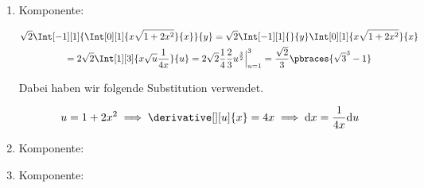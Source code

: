 \begin{solution}
\begin{enumerate}[label = \arabic*.]
    \item Komponente:
    
    \begin{multline*}
        \sqrt 2
        \Int[-1][1]
        {
            \Int[0][1]
            {
                x \sqrt{1 + 2 x^2}
            }{x}
        }{y}
        =
        \sqrt 2
        \Int[-1][1]{}{y}
        \Int[0][1]
        {
            x \sqrt{1 + 2 x^2}
        }{x} \\
        =
        2 \sqrt 2
        \Int[1][3]
        {
            x \sqrt u \frac{1}{4 x}
        }{u}
        =
        2 \sqrt 2
        \frac{1}{4}
        \frac{2}{3}
        u^\frac{3}{2} \Big |_{u=1}^3
        =
        \frac{\sqrt 2}{3}
        \pbraces{\sqrt 3^3 - 1}
    \end{multline*}

    Dabei haben wir folgende Substitution verwendet.

    \begin{align*}
        u = 1 + 2 x^2
        \implies
        \derivative[][u]{x} = 4 x
        \implies
        \mathrm{d} x = \frac{1}{4 x} \mathrm{d} u
    \end{align*}

    \item Komponente:

    \item Komponente:

\end{enumerate}

\end{solution}

